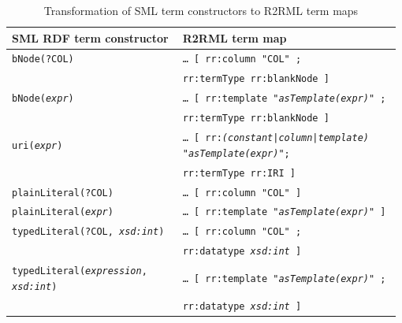 \begin{table}
  {\scriptsize
  \begin{tabular}{@{}p{0.43\linewidth}p{0.55\linewidth}@{}}

    \toprule
    SML RDF term constructor                        & R2RML term map \\
    \midrule
    \texttt{bNode(?COL)}                        & \texttt{\ldots\ [ rr:column "COL" ; } \\
                                                    & \hspace{22pt}\texttt{rr:termType rr:blankNode ]}\\
    \midrule
    \texttt{bNode(\emph{expr})}           & \texttt{\ldots\ [ rr:template "\emph{asTemplate(expr)}" ; } \\
                                                    & \hspace{22pt}\texttt{rr:termType rr:blankNode ]}\\
    \midrule
    \texttt{uri(\emph{expr})}                 & \texttt{\ldots\ [ rr:\emph{(constant|column|template)} "\emph{asTemplate(expr)}";} \\
                                                    & \hspace{22pt}\texttt{rr:termType rr:IRI ]} \\
    \midrule
    \texttt{plainLiteral(?COL)}                     & \texttt{\ldots\ [ rr:column "COL" ] } \\
    \midrule
    \texttt{plainLiteral(\emph{expr})}        & \texttt{\ldots\ [ rr:template "\emph{asTemplate(expr)}" ] } \\
    \midrule
    \texttt{typedLiteral(?COL, \emph{xsd:int})}& \texttt{\ldots\ [ rr:column "COL" ; } \\
                                                    & \hspace{22pt}\texttt{rr:datatype \emph{xsd:int} ]}\\
    \midrule
    \texttt{typedLiteral(\emph{expression}, \emph{xsd:int})}
                                                    & \texttt{\ldots\ [ rr:template "\emph{asTemplate(expr)}" ;} \\
                                                    & \hspace{22pt}\texttt{rr:datatype \emph{xsd:int} ]} \\
    \bottomrule
  \end{tabular}
  }
  \caption{Transformation of SML term constructors to R2RML term maps}
  \label{tbl:termconst2termmap}
\end{table}


